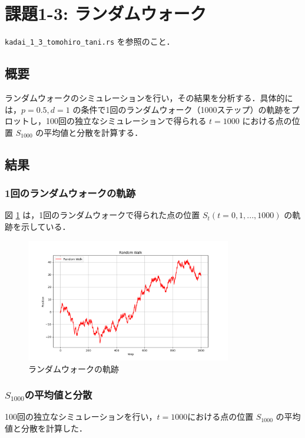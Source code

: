 \documentclass[fleqn, a4paper. 12pt]{jsarticle}
\begin{document}
  \newpage

  \section*{課題1-3: ランダムウォーク}

    \texttt{kadai\_1\_3\_tomohiro\_tani.rs} を参照のこと．

    \subsection*{概要}
    ランダムウォークのシミュレーションを行い，その結果を分析する．具体的には，$p = 0.5, d = 1$ の条件で1回のランダムウォーク（1000ステップ）の軌跡をプロットし，100回の独立なシミュレーションで得られる $t = 1000$ における点の位置 $S_{1000}$ の平均値と分散を計算する．
    
    \subsection*{結果}
    
    \subsubsection*{1回のランダムウォークの軌跡}
    図 \ref{fig:4} は，1回のランダムウォークで得られた点の位置 $S_t (t = 0, 1, ..., 1000)$ の軌跡を示している．
    
    \begin{figure}[h]
    \centering
    \includegraphics[width=0.8\textwidth]{random_walk_plot.png}
    \caption{ランダムウォークの軌跡}
    \label{fig:4}
    \end{figure}
    
    \subsubsection*{$S_{1000}$の平均値と分散}
    100回の独立なシミュレーションを行い，$t = 1000$における点の位置 $S_{1000}$ の平均値と分散を計算した．
    
\end{document}
